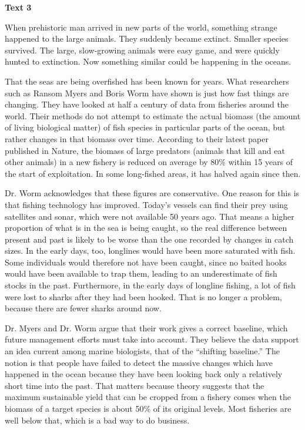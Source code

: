 \begin{center}\textbf{Text 3}\end{center}

\qquad When prehistoric man arrived in new parts of the world, something strange happened to the large animals. They suddenly became extinct. Smaller species survived. The large, slow-growing animals were easy game, and were quickly hunted to extinction. Now something similar could be happening in the oceans.

\qquad That the seas are being overfished has been known for years. What researchers such as Ransom Myers and Boris Worm have shown is just how fast things are changing. They have looked at half a century of data from fisheries around the world. Their methods do not attempt to estimate the actual biomass (the amount of living biological matter) of fish species in particular parts of the ocean, but rather changes in that biomass over time. According to their latest paper published in Nature, the biomass of large predators (animals that kill and eat other animals) in a new fishery is reduced on average by 80\% within 15 years of the start of exploitation. In some long-fished areas, it has halved again since then.

\qquad Dr. Worm acknowledges that these figures are conservative. One reason for this is that fishing technology has improved. Today’s vessels can find their prey using satellites and sonar, which were not available 50 years ago. That means a higher proportion of what is in the sea is being caught, so the real difference between present and past is likely to be worse than the one recorded by changes in catch sizes. In the early days, too, longlines would have been more saturated with fish. Some individuals would therefore not have been caught, since no baited hooks would have been available to trap them, leading to an underestimate of fish stocks in the past. Furthermore, in the early days of longline fishing, a lot of fish were lost to sharks after they had been hooked. That is no longer a problem, because there are fewer sharks around now.

\qquad Dr. Myers and Dr. Worm argue that their work gives a correct baseline, which future management efforts must take into account. They believe the data support an idea current among marine biologists, that of the “shifting baseline.” The notion is that people have failed to detect the massive changes which have happened in the ocean because they have been looking back only a relatively short time into the past. That matters because theory suggests that the maximum sustainable yield that can be cropped from a fishery comes when the biomass of a target species is about 50\% of its original levels. Most fisheries are well below that, which is a bad way to do business.

